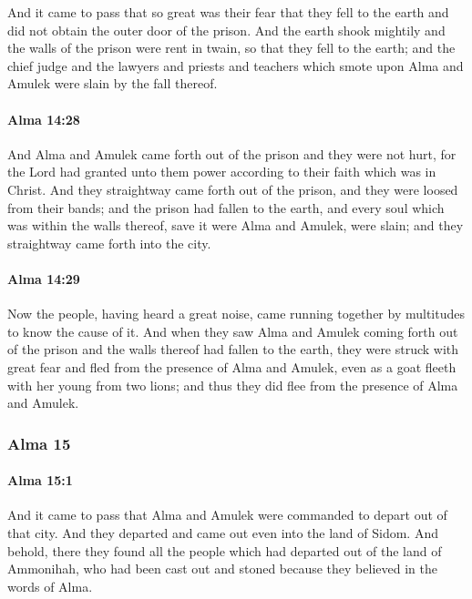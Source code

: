 			And it came to pass that so great was their fear
			that they fell to the earth and did not obtain the outer door of the prison.
			And the earth shook mightily and the walls of the prison were rent in twain,
			so that they fell to the earth;
			and the chief judge and the lawyers and priests and teachers
			which smote upon Alma and Amulek
			were slain by the fall thereof.

		\paragraph{Alma 14:28} %
			\label{ALMA-14-28}

			And Alma and Amulek came forth out of the prison
			and they were not hurt,
			for the Lord had granted unto them power
			according to their faith which was in Christ.
			And they straightway came forth out of the prison,
			and they were loosed from their bands;
			and the prison had fallen to the earth,
			and every soul which was within the walls thereof,
			save it were Alma and Amulek, were slain;
			and they straightway came forth into the city.

		\paragraph{Alma 14:29} %
			\label{ALMA-14-29}

			Now the people, having heard a great noise,
			came running together by multitudes to know the cause of it.
			And when they saw Alma and Amulek coming forth out of the prison
			and the walls thereof had fallen to the earth,
			they were struck with great fear
			and fled from the presence of Alma and Amulek,
			even as a goat fleeth with her young from two lions;
			and thus they did flee from the presence of Alma and Amulek.

	\subsubsection{Alma 15} %
		\label{ALMA-15}
		
		\paragraph{Alma 15:1} %
			\label{ALMA-15-1}

			And it came to pass that
			Alma and Amulek were commanded to depart out of that city.
			And they departed and came out even into the land of Sidom.
			And behold, there they found all the people
			which had departed out of the land of Ammonihah,
			who had been cast out and stoned
			because they believed in the words of Alma.

